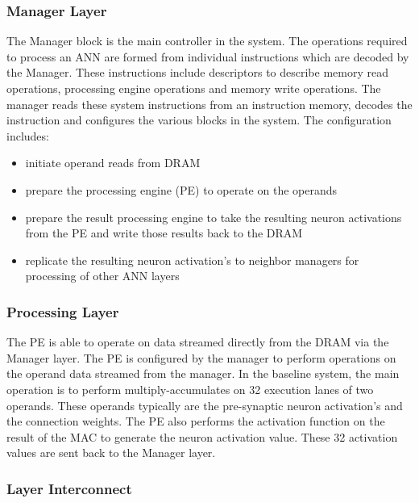 \documentclass[journal]{IEEEtran}
\begin{document}
\subsubsection{Manager Layer}
The Manager block is the main controller in the system. The operations required to process an ANN are formed from individual instructions which are decoded by the Manager. 
These instructions include descriptors to describe memory read operations, processing engine operations and memory write operations. The manager reads these system instructions from an instruction memory, decodes the instruction and configures the various blocks in the system.
The configuration includes:
\begin{itemize}

      \item initiate operand reads from DRAM
      \item prepare the processing engine (PE) to operate on the operands
      \item prepare the result processing engine to take the resulting neuron activations from the PE and write those results back to the DRAM
      \item replicate the resulting neuron activation's to neighbor managers for processing of other ANN layers

\end{itemize}

\subsubsection{Processing Layer}
\label{ssec:Processing Layer}
The PE is able to operate on data streamed directly from the DRAM via the Manager layer. The PE is configured by the manager to perform operations on the operand data streamed from the manager. In the baseline system, the main operation is to perform multiply-accumulates on 32 execution lanes of two operands. These operands typically are the pre-synaptic neuron activation's and the connection weights. The PE also performs the activation function on the result of the MAC to generate the neuron activation value. These 32 activation values are sent back to the Manager layer.

\subsubsection{Layer Interconnect}
\label{ssec:Layer Interconnect}
\end{document}
